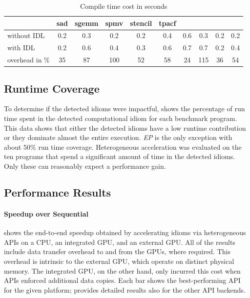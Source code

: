 \begin{table}[p]
\begin{tabular}{lccccccccc}
  & \hspace{0.44mm}sad\hspace{0.44mm}
  & \hspace{0.44mm}sgemm\hspace{0.44mm}
  & \hspace{0.44mm}spmv\hspace{0.44mm}
  & \hspace{0.44mm}stencil\hspace{0.44mm}
  & \hspace{0.44mm}tpacf\hspace{0.44mm} \\
  \midrule
without IDL    & 0.2 & 0.3 & 0.2 & 0.2 & 0.4 & 0.6 & 0.3 & 0.2 & 0.2 \\[0.25em]
with IDL       & 0.2 & 0.6 & 0.4 & 0.3 & 0.6 & 0.7 & 0.7 & 0.2 & 0.4 \\[0.75em]
overhead in \% &  35 &  87 & 100 &  52 &  58 &  24 & 115 &  36 &  54 \\
  \bottomrule
\end{tabular}
\caption{Compile time cost in seconds}
\label{tab:compiletimecost}
\end{table}

\subsection{Runtime Coverage}

    To determine if the detected idioms were impactful, 
    shows the percentage of run time spent in the detected computational idiom
    for each benchmark program.
    This data shows that either the detected idioms have a low runtime
    contribution or they dominate almost the entire execution.
    \emph{EP} is the only exception with about 50\% run time coverage.
    Heterogeneous acceleration was evaluated on the ten programs that spend a
    significant amount of time in the detected idioms.
    Only these can reasonably expect a performance gain.

\subsection{Performance Results}

\paragraph*{Speedup over Sequential}

     shows the end-to-end speedup obtained by
    accelerating idioms via heterogeneous APIs on a CPU, an integrated GPU,
    and an external GPU.
    All of the results include data transfer overhead to and from the GPUs,
    where required.
    This overhead is intrinsic to the external GPU, which operate on distinct
    physical memory.
    The integrated GPU, on the other hand, only incurred this cost when APIs
    enforced additional data copies.
    Each bar shows the best-performing API for the given platform;
     provides detailed results also for the other
    API backends.

